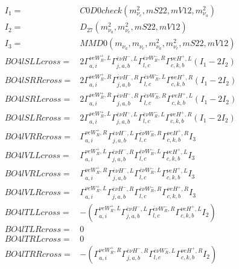 \documentclass[A4,landscape]{article}
\begin{document}
\begin{align} 
I_1 = & C0D0check(m^2_{\nu_{{c}}}, mS22, mV12, m^2_{\nu_{{a}}}) \\ 
I_2 = & D_{27}(m^2_{\nu_{{a}}}, m^2_{\nu_{{c}}}, mS22, mV12) \\ 
I_3 = & MMD0(m_{\nu_{{a}}}, m_{\nu_{{c}}}, m^2_{\nu_{{a}}}, m^2_{\nu_{{c}}}, mS22, mV12) \\ 
  BO4lSLLcross= & 2  \Gamma^{\nu e W_R^+,L}_{a, i} \Gamma^{\bar{e}\nu H^- ,L}_{j, a, b} \Gamma^{\bar{e}\nu W_R^- ,R}_{l, c} \Gamma^{\nu e H^+,L}_{c, k, b} (I_1 - 2 I_2) \\ 
  BO4lSRRcross= & 2  \Gamma^{\nu e W_R^+,R}_{a, i} \Gamma^{\bar{e}\nu H^- ,R}_{j, a, b} \Gamma^{\bar{e}\nu W_R^- ,L}_{l, c} \Gamma^{\nu e H^+,R}_{c, k, b} (I_1 - 2 I_2) \\ 
  BO4lSRLcross= & 2  \Gamma^{\nu e W_R^+,R}_{a, i} \Gamma^{\bar{e}\nu H^- ,R}_{j, a, b} \Gamma^{\bar{e}\nu W_R^- ,R}_{l, c} \Gamma^{\nu e H^+,L}_{c, k, b} (I_1 - 2 I_2) \\ 
  BO4lSLRcross= & 2  \Gamma^{\nu e W_R^+,L}_{a, i} \Gamma^{\bar{e}\nu H^- ,L}_{j, a, b} \Gamma^{\bar{e}\nu W_R^- ,L}_{l, c} \Gamma^{\nu e H^+,R}_{c, k, b} (I_1 - 2 I_2) \\ 
  BO4lVRRcross= &  \Gamma^{\nu e W_R^+,R}_{a, i} \Gamma^{\bar{e}\nu H^- ,L}_{j, a, b} \Gamma^{\bar{e}\nu W_R^- ,R}_{l, c} \Gamma^{\nu e H^+,R}_{c, k, b} I_3 \\ 
  BO4lVLLcross= &  \Gamma^{\nu e W_R^+,L}_{a, i} \Gamma^{\bar{e}\nu H^- ,R}_{j, a, b} \Gamma^{\bar{e}\nu W_R^- ,L}_{l, c} \Gamma^{\nu e H^+,L}_{c, k, b} I_3 \\ 
  BO4lVRLcross= &  \Gamma^{\nu e W_R^+,R}_{a, i} \Gamma^{\bar{e}\nu H^- ,L}_{j, a, b} \Gamma^{\bar{e}\nu W_R^- ,L}_{l, c} \Gamma^{\nu e H^+,L}_{c, k, b} I_3 \\ 
  BO4lVLRcross= &  \Gamma^{\nu e W_R^+,L}_{a, i} \Gamma^{\bar{e}\nu H^- ,R}_{j, a, b} \Gamma^{\bar{e}\nu W_R^- ,R}_{l, c} \Gamma^{\nu e H^+,R}_{c, k, b} I_3 \\ 
  BO4lTLLcross= & -( \Gamma^{\nu e W_R^+,L}_{a, i} \Gamma^{\bar{e}\nu H^- ,L}_{j, a, b} \Gamma^{\bar{e}\nu W_R^- ,R}_{l, c} \Gamma^{\nu e H^+,L}_{c, k, b} I_2) \\ 
  BO4lTLRcross= & 0 \\ 
  BO4lTRLcross= & 0 \\ 
  BO4lTRRcross= & -( \Gamma^{\nu e W_R^+,R}_{a, i} \Gamma^{\bar{e}\nu H^- ,R}_{j, a, b} \Gamma^{\bar{e}\nu W_R^- ,L}_{l, c} \Gamma^{\nu e H^+,R}_{c, k, b} I_2) \\ 
\end{align} 
\end{document}

